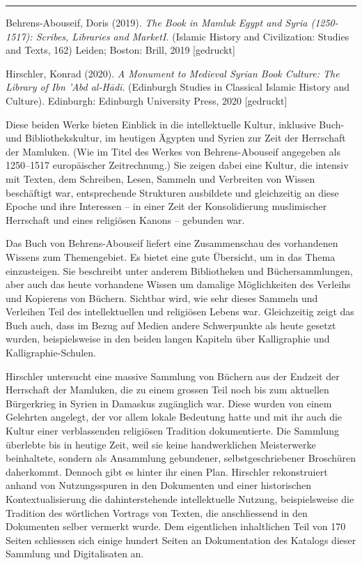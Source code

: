 \documentclass[a4paper,
fontsize=11pt,
oneside,
numbers=noperiodatend,
parskip=half-,
bibliography=totoc,
final
]{scrartcl}
\begin{document}
\begin{center}\rule{0.5\linewidth}{0.5pt}\end{center}

Behrens-Abouseif, Doris (2019). \emph{The Book in Mamluk Egypt and Syria
(1250-1517): Scribes, Libraries and MarketI.} (Islamic History and
Civilization: Studies and Texts, 162) Leiden; Boston: Brill, 2019
{[}gedruckt{]}

Hirschler, Konrad (2020). \emph{A Monument to Medieval Syrian Book
Culture: The Library of Ibn 'Abd al-Hādī}. (Edinburgh Studies in
Classical Islamic History and Culture). Edinburgh: Edinburgh University
Press, 2020 {[}gedruckt{]}

Diese beiden Werke bieten Einblick in die intellektuelle Kultur,
inklusive Buch- und Bibliothekskultur, im heutigen Ägypten und Syrien
zur Zeit der Herrschaft der Mamluken. (Wie im Titel des Werkes von
Behrens-Abouseif angegeben als 1250--1517 europäischer Zeitrechnung.)
Sie zeigen dabei eine Kultur, die intensiv mit Texten, dem Schreiben,
Lesen, Sammeln und Verbreiten von Wissen beschäftigt war, entsprechende
Strukturen ausbildete und gleichzeitig an diese Epoche und ihre
Interessen -- in einer Zeit der Konsolidierung muslimischer Herrschaft
und eines religiösen Kanons -- gebunden war.

Das Buch von Behrens-Abouseif liefert eine Zusammenschau des vorhandenen
Wissens zum Themengebiet. Es bietet eine gute Übersicht, um in das Thema
einzusteigen. Sie beschreibt unter anderem Bibliotheken und
Büchersammlungen, aber auch das heute vorhandene Wissen um damalige
Möglichkeiten des Verleihs und Kopierens von Büchern. Sichtbar wird, wie
sehr dieses Sammeln und Verleihen Teil des intellektuellen und
religiösen Lebens war. Gleichzeitig zeigt das Buch auch, dass im Bezug
auf Medien andere Schwerpunkte als heute gesetzt wurden, beispielsweise
in den beiden langen Kapiteln über Kalligraphie und
Kalligraphie-Schulen.

Hirschler untersucht eine massive Sammlung von Büchern aus der Endzeit
der Herrschaft der Mamluken, die zu einem grossen Teil noch bis zum
aktuellen Bürgerkrieg in Syrien in Damaskus zugänglich war. Diese wurden
von einem Gelehrten angelegt, der vor allem lokale Bedeutung hatte und
mit ihr auch die Kultur einer verblassenden religiösen Tradition
dokumentierte. Die Sammlung überlebte bis in heutige Zeit, weil sie
keine handwerklichen Meisterwerke beinhaltete, sondern als Ansammlung
gebundener, selbstgeschriebener Broschüren daherkommt. Dennoch gibt es
hinter ihr einen Plan. Hirschler rekonstruiert anhand von Nutzungsspuren
in den Dokumenten und einer historischen Kontextualisierung die
dahinterstehende intellektuelle Nutzung, beispielsweise die Tradition
des wörtlichen Vortrags von Texten, die anschliessend in den Dokumenten
selber vermerkt wurde. Dem eigentlichen inhaltlichen Teil von 170 Seiten
schliessen sich einige hundert Seiten an Dokumentation des Katalogs
dieser Sammlung und Digitalisaten an.
\end{document}
